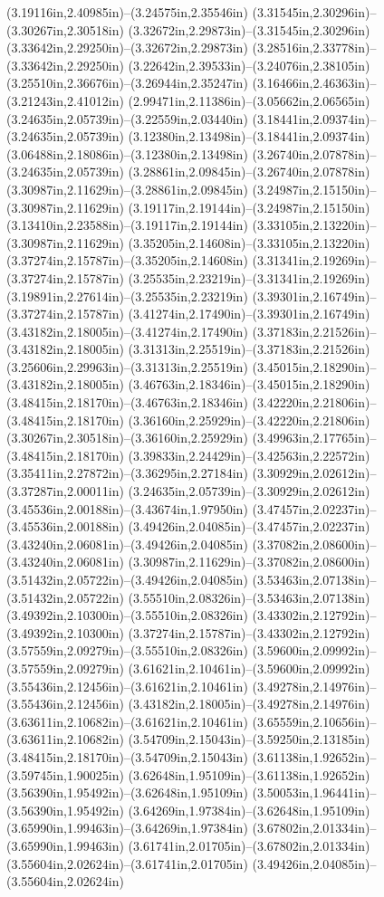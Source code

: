 (3.19116in,2.40985in)--(3.24575in,2.35546in) (3.31545in,2.30296in)--(3.30267in,2.30518in) (3.32672in,2.29873in)--(3.31545in,2.30296in) (3.33642in,2.29250in)--(3.32672in,2.29873in) (3.28516in,2.33778in)--(3.33642in,2.29250in) (3.22642in,2.39533in)--(3.24076in,2.38105in) (3.25510in,2.36676in)--(3.26944in,2.35247in) (3.16466in,2.46363in)--(3.21243in,2.41012in) (2.99471in,2.11386in)--(3.05662in,2.06565in) (3.24635in,2.05739in)--(3.22559in,2.03440in) (3.18441in,2.09374in)--(3.24635in,2.05739in) (3.12380in,2.13498in)--(3.18441in,2.09374in) (3.06488in,2.18086in)--(3.12380in,2.13498in) (3.26740in,2.07878in)--(3.24635in,2.05739in) (3.28861in,2.09845in)--(3.26740in,2.07878in) (3.30987in,2.11629in)--(3.28861in,2.09845in) (3.24987in,2.15150in)--(3.30987in,2.11629in) (3.19117in,2.19144in)--(3.24987in,2.15150in) (3.13410in,2.23588in)--(3.19117in,2.19144in) (3.33105in,2.13220in)--(3.30987in,2.11629in) (3.35205in,2.14608in)--(3.33105in,2.13220in) (3.37274in,2.15787in)--(3.35205in,2.14608in) (3.31341in,2.19269in)--(3.37274in,2.15787in) (3.25535in,2.23219in)--(3.31341in,2.19269in) (3.19891in,2.27614in)--(3.25535in,2.23219in) (3.39301in,2.16749in)--(3.37274in,2.15787in) (3.41274in,2.17490in)--(3.39301in,2.16749in) (3.43182in,2.18005in)--(3.41274in,2.17490in) (3.37183in,2.21526in)--(3.43182in,2.18005in) (3.31313in,2.25519in)--(3.37183in,2.21526in) (3.25606in,2.29963in)--(3.31313in,2.25519in) (3.45015in,2.18290in)--(3.43182in,2.18005in) (3.46763in,2.18346in)--(3.45015in,2.18290in) (3.48415in,2.18170in)--(3.46763in,2.18346in) (3.42220in,2.21806in)--(3.48415in,2.18170in) (3.36160in,2.25929in)--(3.42220in,2.21806in) (3.30267in,2.30518in)--(3.36160in,2.25929in) (3.49963in,2.17765in)--(3.48415in,2.18170in) (3.39833in,2.24429in)--(3.42563in,2.22572in) (3.35411in,2.27872in)--(3.36295in,2.27184in) (3.30929in,2.02612in)--(3.37287in,2.00011in) (3.24635in,2.05739in)--(3.30929in,2.02612in) (3.45536in,2.00188in)--(3.43674in,1.97950in) (3.47457in,2.02237in)--(3.45536in,2.00188in) (3.49426in,2.04085in)--(3.47457in,2.02237in) (3.43240in,2.06081in)--(3.49426in,2.04085in) (3.37082in,2.08600in)--(3.43240in,2.06081in) (3.30987in,2.11629in)--(3.37082in,2.08600in) (3.51432in,2.05722in)--(3.49426in,2.04085in) (3.53463in,2.07138in)--(3.51432in,2.05722in) (3.55510in,2.08326in)--(3.53463in,2.07138in) (3.49392in,2.10300in)--(3.55510in,2.08326in) (3.43302in,2.12792in)--(3.49392in,2.10300in) (3.37274in,2.15787in)--(3.43302in,2.12792in) (3.57559in,2.09279in)--(3.55510in,2.08326in) (3.59600in,2.09992in)--(3.57559in,2.09279in) (3.61621in,2.10461in)--(3.59600in,2.09992in) (3.55436in,2.12456in)--(3.61621in,2.10461in) (3.49278in,2.14976in)--(3.55436in,2.12456in) (3.43182in,2.18005in)--(3.49278in,2.14976in) (3.63611in,2.10682in)--(3.61621in,2.10461in) (3.65559in,2.10656in)--(3.63611in,2.10682in) (3.54709in,2.15043in)--(3.59250in,2.13185in) (3.48415in,2.18170in)--(3.54709in,2.15043in) (3.61138in,1.92652in)--(3.59745in,1.90025in) (3.62648in,1.95109in)--(3.61138in,1.92652in) (3.56390in,1.95492in)--(3.62648in,1.95109in) (3.50053in,1.96441in)--(3.56390in,1.95492in) (3.64269in,1.97384in)--(3.62648in,1.95109in) (3.65990in,1.99463in)--(3.64269in,1.97384in) (3.67802in,2.01334in)--(3.65990in,1.99463in) (3.61741in,2.01705in)--(3.67802in,2.01334in) (3.55604in,2.02624in)--(3.61741in,2.01705in) (3.49426in,2.04085in)--(3.55604in,2.02624in) 